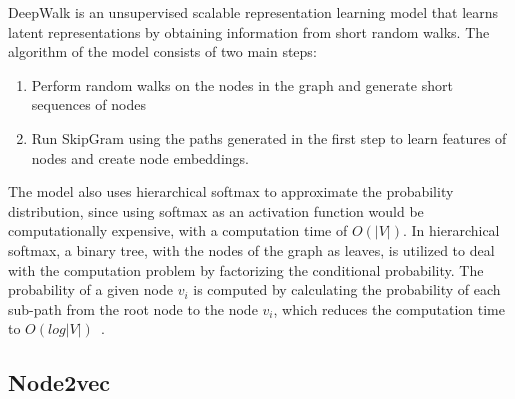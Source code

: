 DeepWalk is an unsupervised scalable representation learning model that learns latent representations by obtaining information from short random walks.
The algorithm of the model consists of two main steps:
\begin{enumerate}[1.]
    \item Perform random walks on the nodes in the graph and generate short sequences of nodes
    \item Run SkipGram using the paths generated in the first step to learn features of nodes and create node embeddings.
\end{enumerate}
The model also uses hierarchical softmax to approximate the probability distribution, since using softmax as an activation function would be computationally expensive, with a computation time of $O(|V|)$.
In hierarchical softmax, a binary tree, with the nodes of the graph as leaves, is utilized to deal with the computation problem by factorizing the conditional probability.
The probability of a given node $v_{i}$ is computed by calculating the probability of each sub-path from the root node to the node $v_{i}$, which reduces the computation time to $O(log|V|)$~\cite{perozzi_deepwalk:_2014}.

\begin{figure}[h!]
\end{figure}

\subsection{Node2vec}\label{subsection:node2vec}

